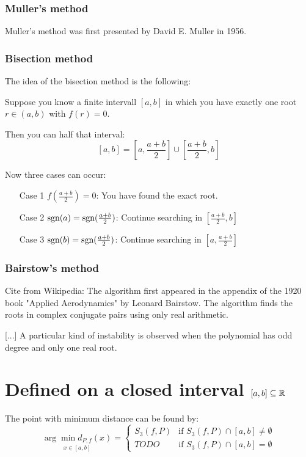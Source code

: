 \subsubsection{Muller's method}
Muller's method was first presented by David E. Muller in 1956.


\subsubsection{Bisection method}
The idea of the bisection method is the following:

Suppose you know a finite intervall $[a,b]$ in which you have
exactly one root $r \in (a,b)$ with $f(r) = 0$.

Then you can half that interval:
    \[[a, b] = \left [a, \frac{a+b}{2} \right ] \cup \left [\frac{a+b}{2}, b \right ]\]

Now three cases can occur:
\begin{enumerate}
    \item[Case 1] $f(\frac{a+b}{2})=0$: You have found the exact root.
    \item[Case 2] $\text{sgn}(a) = \text{sgn}(\frac{a+b}{2})$: Continue searching in $[\frac{a+b}{2}, b]$
    \item[Case 3] $\text{sgn}(b) = \text{sgn}(\frac{a+b}{2})$: Continue searching in $[a, \frac{a+b}{2}]$
\end{enumerate}


\subsubsection{Bairstow's method}
Cite from Wikipedia:
The algorithm first appeared in the appendix of the 1920 book "Applied Aerodynamics" by Leonard Bairstow. The algorithm finds the roots in complex conjugate pairs using only real arithmetic.

[...]
A particular kind of instability is observed when the polynomial has odd degree and only one real root.



\section{Defined on a closed interval $[a,b] \subseteq \mathbb{R}$}
The point with minimum distance can be found by:
\[\underset{x\in[a,b]}{\arg \min d_{P,f}(x)} = \begin{cases}
 S_3(f, P) &\text{if } S_3(f, P) \cap [a,b] \neq \emptyset\\
  TODO     &\text{if } S_3(f, P) \cap [a,b] = \emptyset
    \end{cases}\]
